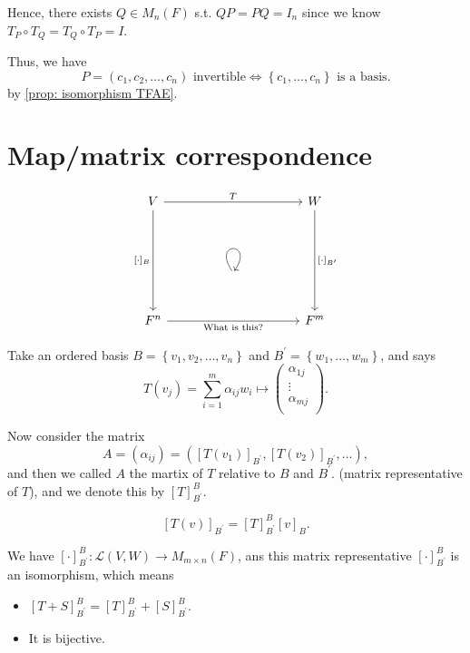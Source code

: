 Hence, there exists \(Q \in M_n(F)\) s.t. \(QP = PQ = I_n\) since we know \(T_P \circ T_Q = T_Q \circ T_P = I\). 

Thus, we have 
\[
    P = (c_1, c_2, \dots , c_n) \text{ invertible} \iff \left\{ c_1, \dots , c_n \right\} \text{ is a basis.} 
\]
by \autoref{prop: isomorphism TFAE}. 

\section{Map/matrix correspondence}
\[\begin{tikzcd}[sep=huge]
	V && W \\
	& {} \\
	{F^n} && {F^m}
	\arrow["T", from=1-1, to=1-3]
	\arrow["{[\cdot]_B}"', from=1-1, to=3-1]
	\arrow["{[\cdot]_{B'}}", from=1-3, to=3-3]
	\arrow[shift right=5, from=2-2, to=2-2, loop, in=55, out=125, distance=10mm]
	\arrow["{\text{What is this?}}"', from=3-1, to=3-3]
\end{tikzcd}\]

Take an ordered basis \(B = \left\{ v_1, v_2, \dots , v_n \right\} \) and \(B^{\prime} = \left\{ w_1, \dots , w_m \right\} \), and says 
\[
    T(v_j) = \sum_{i=1}^m \alpha _{ij} w_i \mapsto \begin{pmatrix}
         \alpha _{1j} \\
          \vdots \\
          \alpha _{mj}\\
    \end{pmatrix}. 
\]  

Now consider the matrix 
\[
    A = (\alpha _{ij}) = \left( [T(v_1)]_{B^{\prime} }, [T(v_2)]_{B^{\prime} }, \dots  \right) ,
\] and then we called \(A\) the martix of \(T\) relative to \(B\) and \(B^{\prime} \). (matrix representative of \(T\)), and we denote this by \([T]_{B^{\prime} }^B\). 
\begin{theorem}
    \[
        [T(v)]_{B^{\prime} } = [T]_{B^{\prime} }^B [v]_B.
    \]
\end{theorem}     

\begin{theorem} 
    We have \([\cdot]_{B^{\prime} }^B : \mathcal{L} (V, W) \to M_{m \times n}(F)\), ans this matrix representative \([\cdot]_{B^{\prime} }^B\) is an isomorphism, which means 
    \begin{itemize}
        \item \([T + S]_{B^{\prime} }^B = [T]_{B^{\prime} }^B + [S]_{B^{\prime} }^B\).
        \item It is bijective.  
    \end{itemize} 
\end{theorem}  

